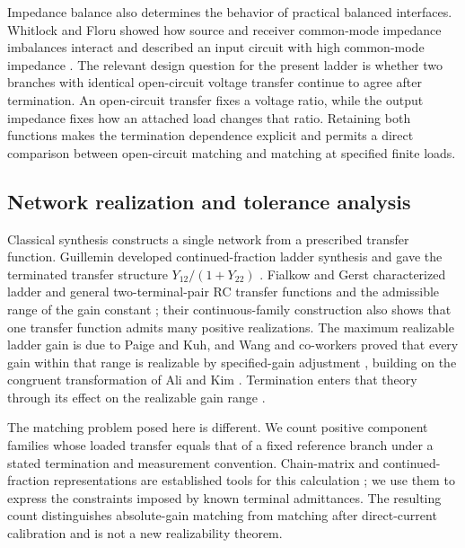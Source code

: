 Impedance balance also determines the behavior of practical balanced interfaces. Whitlock and Floru showed how source and receiver common-mode impedance imbalances interact and described an input circuit with high common-mode impedance \citep{whitlock2004balancedinput}. The relevant design question for the present ladder is whether two branches with identical open-circuit voltage transfer continue to agree after termination. An open-circuit transfer fixes a voltage ratio, while the output impedance fixes how an attached load changes that ratio. Retaining both functions makes the termination dependence explicit and permits a direct comparison between open-circuit matching and matching at specified finite loads.

\subsection{Network realization and tolerance analysis}
Classical synthesis constructs a single network from a prescribed transfer function. Guillemin developed continued-fraction ladder synthesis and gave the terminated transfer structure $Y_{12}/(1+Y_{22})$ \citep{guillemin1949rcsynthesis}. Fialkow and Gerst characterized ladder and general two-terminal-pair RC transfer functions and the admissible range of the gain constant \citep{fialkow1951rcladder,fialkow1952rcnetworks}; their continuous-family construction also shows that one transfer function admits many positive realizations. The maximum realizable ladder gain is due to Paige and Kuh, and Wang and co-workers proved that every gain within that range is realizable by specified-gain adjustment \citep{paige1960maximum,wang2017rcladder}, building on the congruent transformation of Ali and Kim \citep{ali1975continuous}. Termination enters that theory through its effect on the realizable gain range \citep{fialkow1951rcladder,fialkow1952rcnetworks}.

The matching problem posed here is different. We count positive component families whose loaded transfer equals that of a fixed reference branch under a stated termination and measurement convention. Chain-matrix and continued-fraction representations are established tools for this calculation \citep{guillemin1949rcsynthesis,fialkow1951rcladder,lee1978chain}; we use them to express the constraints imposed by known terminal admittances. The resulting count distinguishes absolute-gain matching from matching after direct-current calibration and is not a new realizability theorem.

